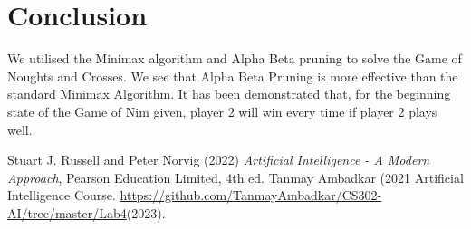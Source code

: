 \documentclass[conference]{IEEEtran}
\begin{document}
\section{Conclusion}
We utilised the Minimax algorithm and Alpha Beta pruning to solve the Game of Noughts and Crosses. We see that Alpha Beta Pruning is more effective than the standard Minimax Algorithm. It has been demonstrated that, for the beginning state of the Game of Nim given, player 2 will win every time if player 2 plays well.

\begin{thebibliography}{}
\bibitem{}
 Stuart J. Russell and Peter
Norvig (2022) \emph{Artificial Intelligence - A Modern Approach}, Pearson Education Limited, 4th ed.
\bibitem{}
Tanmay Ambadkar (2021 Artificial Intelligence Course. \href{https://github.com/TanmayAmbadkar/CS302-AI/tree/master/Lab4}{https://github.com/TanmayAmbadkar/CS302-AI/tree/master/Lab4}(2023).
\end{thebibliography}
\end{document}
